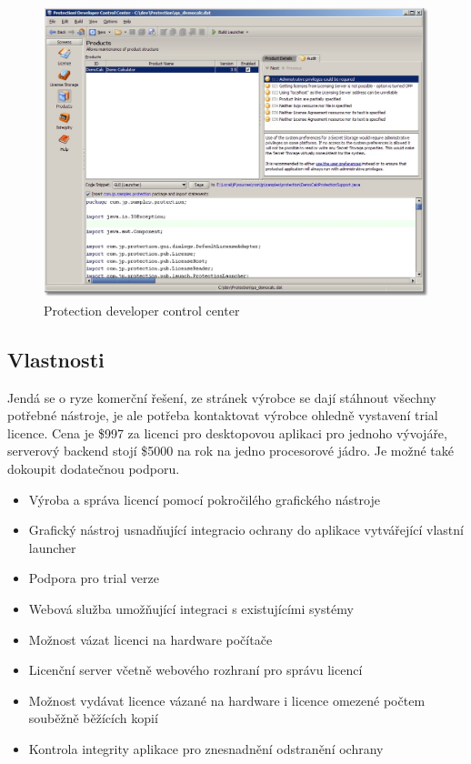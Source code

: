 \begin{figure}[H]
\begin{center}
\includegraphics[width=12cm]{figures/protection4.PNG}
\caption{Protection developer control center}
\label{fig:protection4-ui} 
\end{center}
\end{figure}

\subsection*{Vlastnosti}
Jendá se o ryze komerční řešení, ze stránek výrobce se dají stáhnout všechny
potřebné nástroje, je ale potřeba kontaktovat výrobce ohledně vystavení trial
licence. Cena je \$997 za licenci pro desktopovou aplikaci pro jednoho
vývojáře, serverový backend stojí \$5000 na rok na jedno procesorové jádro. Je
možné také dokoupit dodatečnou podporu.

\begin{itemize}
  \item Výroba a správa licencí pomocí pokročilého grafického nástroje
  \item Grafický nástroj usnadňující integracio ochrany do aplikace vytvářející
  vlastní launcher
  \item Podpora pro trial verze
  \item Webová služba umožňující integraci s existujícími systémy
  \item Možnost vázat licenci na hardware počítače
  \item Licenční server včetně webového rozhraní pro správu licencí
  \item Možnost vydávat licence vázané na hardware i licence omezené počtem
  souběžně běžících kopií
  \item Kontrola integrity aplikace pro znesnadnění odstranění ochrany
\end{itemize}


